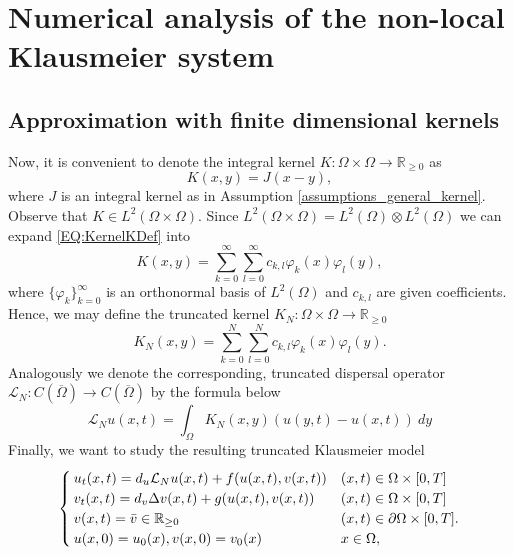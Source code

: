 \documentclass[12pt, a4paper]{article}
\theoremstyle{break}
\theoremstyle{break}
\theoremstyle{break}
\theoremstyle{break}
\theoremstyle{break}
\theoremstyle{break}
\theoremstyle{break}
\begin{document}
\section{Numerical analysis of the non-local Klausmeier system}

\subsection{Approximation with finite dimensional kernels}

Now, it is convenient to denote the integral kernel $K: \Omega \times \Omega \rightarrow \mathbb{R}_{\geq 0}$ as
\begin{equation}
    \label{EQ:KernelKDef}
    K(x, y) = J(x-y),
\end{equation}
where $J$ is an integral kernel as in Assumption \ref{assumptions_general_kernel}. Observe that $K \in L^2(\Omega \times \Omega)$. Since $L^2(\Omega \times \Omega) = L^2(\Omega) \otimes L^2(\Omega)$ we can expand \eqref{EQ:KernelKDef} into
\begin{equation*}
    K(x, y) = \sum_{k=0}^\infty \sum_{l=0}^\infty c_{k, l} \varphi_k(x) \varphi_l(y),
\end{equation*}
where $\{\varphi_k\}_{k=0}^\infty$ is an orthonormal basis of $L^2(\Omega)$ and $c_{k,l}$ are given coefficients. Hence, we may define the truncated kernel $K_N : \Omega \times \Omega \rightarrow \mathbb{R}_{\geq 0}$
\begin{equation}
    \label{EQ:TruncatedKernelKDef}
    K_N(x, y) = \sum_{k=0}^N \sum_{l=0}^N c_{k, l} \varphi_k(x) \varphi_l(y).
\end{equation}
Analogously we denote the corresponding, truncated dispersal operator $\mathcal{L}_N: C(\overline{\Omega}) \rightarrow C(\overline{\Omega})$ by the formula below
\begin{equation}
    \label{EQ:TruncatedDispersalOperatorDef}
    \mathcal{L}_N u(x, t) = \int_\Omega K_N(x,y) \left(u(y,t) - u(x,t) \right)\:dy
\end{equation}
Finally, we want to study the resulting truncated Klausmeier model
\begin{align}
    \label{EQ:TruncatedKlausmeierSystem}
    \begin{cases}
        u_t(x,t) = d_u\mathcal{L}_N u(x, t) + f(u(x,t), v(x,t)) &(x, t) \in \Omega \times [0, T] \\
        v_t(x,t) = d_v\Delta v(x,t) + g(u(x,t), v(x,t)) &(x, t) \in \Omega \times [0, T] \\
        v(x,t) = \Bar{v} \in \mathbb{R}_{\geq 0} &(x, t) \in \partial\Omega \times [0, T]. \\
        u(x,0) = u_0(x), v(x,0) = v_0(x) &x \in \Omega,
    \end{cases}
\end{align}
\end{document}
